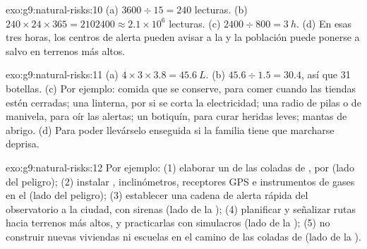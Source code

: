 \begin{solution}{exo:g9:natural-risks:10}
(a) $3600 \div 15 = 240$ lecturas. (b) $240 \times 24 \times 365 =
\num{2102400} \approx 2.1 \times 10^6$ lecturas. (c) $2400 \div 800 =
\qty{3}{h}$. (d) En esas tres horas, los centros de alerta pueden avisar a
la  y la población puede ponerse a salvo en terrenos más altos.
\end{solution}

\begin{solution}{exo:g9:natural-risks:11}
(a) $4 \times 3 \times 3.8 = \qty{45.6}{L}$. (b) $45.6 \div 1.5 = 30.4$,
así que 31 botellas. (c) Por ejemplo: comida que se conserve, para comer
cuando las tiendas estén cerradas; una linterna, por si se corta la
electricidad; una radio de pilas o de manivela, para oír las alertas; un
botiquín, para curar heridas leves; mantas de abrigo. (d) Para poder
llevárselo enseguida si la familia tiene que marcharse deprisa.
\end{solution}

\begin{solution}{exo:g9:natural-risks:12}
Por ejemplo: (1) elaborar un  de las coladas de ,
 por  (lado del peligro); (2) instalar ,
inclinómetros, receptores GPS e instrumentos de gases en el  (lado
del peligro); (3) establecer una cadena de alerta rápida del observatorio
a la ciudad, con sirenas (lado de la ); (4) planificar y
señalizar rutas hacia terrenos más altos, y practicarlas con simulacros
(lado de la ); (5) no construir nuevas viviendas ni escuelas
en el camino de las coladas de  (lado de la ).
\end{solution}

